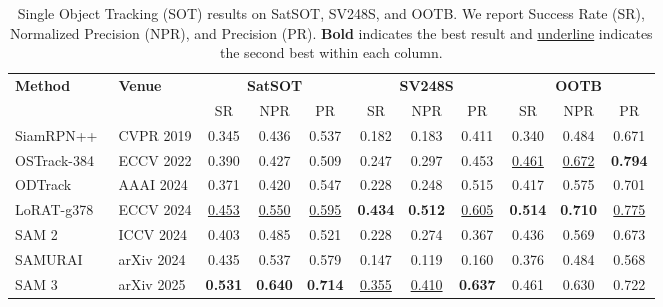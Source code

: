\begin{table}[t]
\centering
\caption{Single Object Tracking (SOT) results on SatSOT, SV248S, and OOTB.
We report Success Rate (SR), Normalized Precision (NPR), and Precision (PR).
\textbf{Bold} indicates the best result and \underline{underline} indicates the second best within each column.}
\label{tab:sot_results}
\setlength{\tabcolsep}{4pt}
\renewcommand{\arraystretch}{1.15}
\begin{tabular}{l l ccc ccc ccc}
\toprule
\multirow{2}{*}{\textbf{Method}} & \multirow{2}{*}{\textbf{Venue}} 
 & \multicolumn{3}{c}{\textbf{SatSOT}}
 & \multicolumn{3}{c}{\textbf{SV248S}}
 & \multicolumn{3}{c}{\textbf{OOTB}} \\
\cmidrule(lr){3-5} \cmidrule(lr){6-8} \cmidrule(lr){9-11}
& & SR & NPR & PR & SR & NPR & PR & SR & NPR & PR \\
\midrule
SiamRPN++~\cite{li2019siamrpn++}    & CVPR 2019  & 0.345             & 0.436             & 0.537             & 0.182             & 0.183             & 0.411             & 0.340             & 0.484             & 0.671             \\
OSTrack-384~\cite{ye2022joint}  & ECCV 2022  & 0.390             & 0.427             & 0.509             & 0.247             & 0.297             & 0.453             & \underline{0.461} & \underline{0.672} & \textbf{0.794}    \\
ODTrack~\cite{zheng2024odtrack}      & AAAI 2024  & 0.371             & 0.420             & 0.547             & 0.228             & 0.248             & 0.515             & 0.417             & 0.575             & 0.701             \\
LoRAT-g378~\cite{lin2024tracking}   & ECCV 2024  & \underline{0.453} & \underline{0.550} & \underline{0.595} & \textbf{0.434}    & \textbf{0.512}    & \underline{0.605} & \textbf{0.514}    & \textbf{0.710}    & \underline{0.775} \\
SAM 2~\cite{ravi2024sam}        & ICCV 2024  & 0.403             & 0.485             & 0.521             & 0.228             & 0.274             & 0.367             & 0.436             & 0.569             & 0.673             \\
SAMURAI~\cite{yang2024samurai}      & arXiv 2024 & 0.435             & 0.537             & 0.579             & 0.147             & 0.119             & 0.160             & 0.376             & 0.484             & 0.568             \\
SAM 3~\cite{carion2025sam}        & arXiv 2025 & \textbf{0.531}    & \textbf{0.640}    & \textbf{0.714}    & \underline{0.355} & \underline{0.410} & \textbf{0.637}    & 0.461             & 0.630             & 0.722             \\
\bottomrule
\end{tabular}
\end{table}

